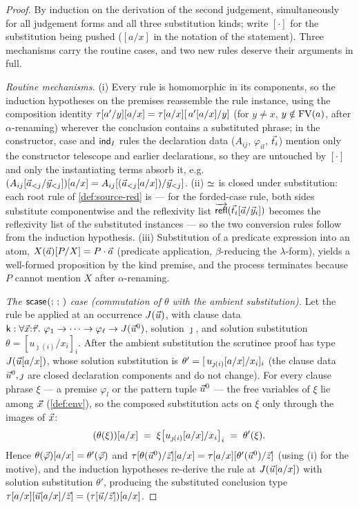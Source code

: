 \begin{proof}
By induction on the derivation of the second judgement, simultaneously
for all judgement forms and all three substitution kinds; write
$[\cdot]$ for the substitution being pushed ($[a/x]$ in the notation
of the statement).  Three mechanisms carry the routine cases, and two
new rules deserve their arguments in full.

\emph{Routine mechanisms.}  (i) Every rule is homomorphic in its
components, so the induction hypotheses on the premises reassemble the
rule instance, using the composition identity
$\tau[a'/y][a/x] = \tau[a/x][\,a'[a/x]/y]$ (for $y
\neq x$, $y \notin \mathrm{FV}(a)$, after $\alpha$-renaming) wherever the
conclusion contains a substituted phrase; in the constructor, case and
$\mathsf{ind}_{I}$ rules the declaration data ($A_{ij}$, $\varphi_{il}$,
$\vec{t}_i$) mention only the constructor telescope and earlier
declarations, so they are untouched by $[\cdot]$ and only the
instantiating terms absorb it, e.g.\
$(A_{ij}[\vec{a}_{<j}/\vec{y}_{<j}])[a/x] =
A_{ij}[(\vec{a}_{<j}[a/x])/\vec{y}_{<j}]$.  (ii) $\simeq$ is closed
under substitution: each root rule of \cref{def:source-red} is ---
for the forded-case rule, both sides substitute componentwise and the
reflexivity list $\overrightarrow{\mathsf{refl}}
(\vec{t}_i[\vec{a}/\vec{y}_i])$ becomes the reflexivity list of the
substituted instances --- so the two conversion rules follow from the
induction hypothesis.  (iii) Substitution of a predicate expression
into an atom, $X(\vec{a})[P/X] = P \cdot \vec{a}$ (predicate
application, $\beta$-reducing the $\lambda$-form), yields a well-formed
proposition by the kind premise, and the process terminates because
$P$ cannot mention $X$ after $\alpha$-renaming.

\emph{The $\mathsf{scase}_{}(;\,;\,)$ case (commutation of $\theta$ with the
ambient substitution).}  Let the rule be applied at an occurrence
$J(\vec{u})$, with clause data $\mathsf{k} : \forall
\vec{x}{:}\vec{\tau}.\ \varphi_1 \to \dots \to \varphi_\ell \to
J(\vec{u}^0)$, solution $\jmath$, and solution substitution $\theta =
[u_{\jmath(i)}/x_i]_i$.  After the ambient substitution the scrutinee
proof has type $J(\vec{u}[a/x])$, whose solution substitution is
$\theta' = [\,u_{\jmath(i)}[a/x]/x_i]_i$ (the clause data
$\vec{u}^0, \jmath$ are closed declaration components and do not
change).  For every clause phrase $\xi$ --- a premise $\varphi_l$ or
the pattern tuple $\vec{u}^0$ --- the free variables of $\xi$ lie
among $\vec{x}$ (\cref{def:env}), so the composed substitution acts on
$\xi$ only through the images of $\vec{x}$:
\[
  (\theta(\xi))[a/x] \;=\; \xi\bigl[u_{\jmath(i)}[a/x]/x_i
  \bigr]_i \;=\; \theta'(\xi).
\]
Hence $\theta(\vec{\varphi})[a/x] = \theta'(\vec{\varphi})$ and
$\tau[\theta(\vec{u}^0)/\vec{z}][a/x] =
\tau[a/x][\theta'(\vec{u}^0)/\vec{z}]$ (using (i) for the
motive), and the induction hypotheses re-derive the rule at
$J(\vec{u}[a/x])$ with solution substitution $\theta'$, producing the
substituted conclusion type $\tau[a/x][\vec{u}[a/x]/\vec{z}]
= (\tau[\vec{u}/\vec{z}])[a/x]$.


\end{proof}
